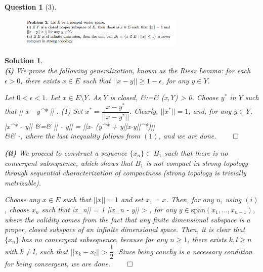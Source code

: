 \documentclass{article} %
\def\eQb#1\eQe{\begin{eqnarray*}#1\end{eqnarray*}}
\theoremstyle{quest}
\newtheorem*{question}{Question}
\newtheorem*{solution}{Solution}
\begin{document}
\begin{question}[3]
\hfill
\begin{figure}[h!]
  \centering
    \includegraphics[width=0.7\textwidth]{funcA-h-e1-p3.png}
\end{figure}
\end{question}
\begin{solution} \hfill \\
\textbf{(i)} We prove the following generalization, known as the Riesz Lemma:
for each $\epsilon > 0$, there exists $x \in E$ such that $||x - y|| 
\geq 1 - \epsilon$, for any $y \in Y$. 

\smallskip

Let $0 < \epsilon < 1$. Let $x \in E\setminus Y$. As $Y$ is closed,
\eQb
d &:=& (x,Y) > 0.
\eQe
Choose $y^*$ in $Y$ such that 
\eQb
d \leq || x - y^* || \leq {}. \>\>\> (1)
\eQe
Set $x^* = \dfrac{x-y^*}{||x-y^*||}$. Clearly, $||x^*|| = 1$, and,
for any $y \in Y$,
\eQb
||x^* - y|| &=& || - y|| = 
||x- (y^* + y||x-y||^*)|| \\
&\geq&   -\epsilon, 
\eQe 
where the last inequality follows from $(1)$, and we are done. \hfill $\qed$ 

\bigskip

\textbf{(ii)} We proceed to construct a sequence $\{x_n\} \subset B_1$ 
such that there is no convergent subsequence, which shows that $B_1$ is not
compact in strong topology through sequential characterization of compactness
(strong topology is trivially metrizable). 

\smallskip
Choose any $x \in E$ such that $||x|| = 1$ and set $x_1 = x$. 
Then, for any $n$, using $(i)$, 
choose $x_n$ such that 
\eQb
||x_n|| = 1 \>\>   \>\> ||x_n - y|| > , 
\eQe
for any $y \in \text{span}(x_1,...,x_{n-1})$, where the validity comes from
the fact that any finite dimensional subspace is a proper, closed subspace
of an infinite dimensional space. Then, it is clear that $\{x_n\}$ has no
convergent subsequence, because for any $n \geq 1$, there exists $k, l \geq n$
with $k \neq l$, such that $||x_k - x_l|| > \dfrac{1}{2}$. Since being cauchy
is a necessary condition for being convergent, we are done. 
\hfill $\qed$ 

\end{solution}
\end{document}
